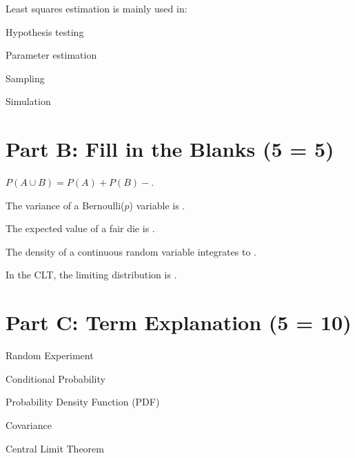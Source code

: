 \documentclass{CWNUExam}
\begin{document}
\begin{question}
Least squares estimation is mainly used in:
\paren
\begin{choices}
\item Hypothesis testing
\item Parameter estimation
\item Sampling
\item Simulation
\end{choices}
\end{question}

\section{Part B: Fill in the Blanks (5  = 5)}

\begin{question}
$P(A\cup B)=P(A)+P(B)-$\fillin.
\end{question}

\begin{question}
The variance of a Bernoulli($p$) variable is \fillin.
\end{question}

\begin{question}
The expected value of a fair die is \fillin.
\end{question}

\begin{question}
The density of a continuous random variable integrates to \fillin.
\end{question}

\begin{question}
In the CLT, the limiting distribution is \fillin.
\end{question}

\section{Part C: Term Explanation (5  = 10)}

\begin{problem}Random Experiment\end{problem}
\begin{problem}Conditional Probability\end{problem}
\begin{problem}Probability Density Function (PDF)\end{problem}
\begin{problem}Covariance\end{problem}
\begin{problem}Central Limit Theorem\end{problem}
\end{document}
